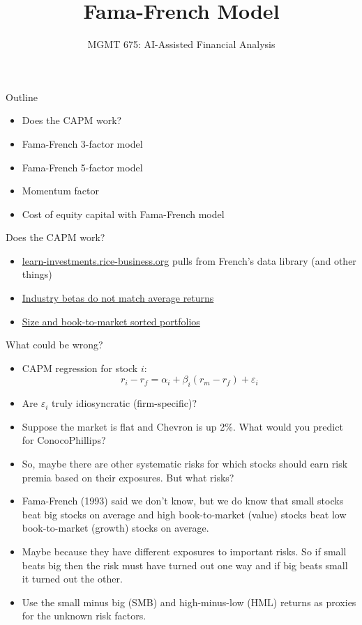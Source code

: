 \documentclass[10pt]{beamer}
\title{Fama-French Model}
\subtitle{MGMT 675: AI-Assisted Financial Analysis}
\date{}
\begin{document}
\begin{frame}[plain]
\titlepage
\end{frame}

\begin{frame}{Outline}
\begin{itemize}
\item Does the CAPM work?
\item Fama-French 3-factor model
\item Fama-French 5-factor model
\item Momentum factor
\item Cost of equity capital with Fama-French model
\end{itemize}
\end{frame}

\begin{frame}{Does the CAPM work?}
\begin{itemize}
    \item \href{https://learn-investments.rice-business.org}{learn-investments.rice-business.org} pulls from French's data library (and other things)
    \item \href{https://learn-investments.rice-business.org/capm/sml-industries}{Industry betas do not match average returns}
    \item \href{https://learn-investments.rice-business.org/capm/two-way-capm}{Size and book-to-market sorted portfolios}
\end{itemize}
\end{frame}


\begin{frame}{What could be wrong?}
\begin{itemize}
\item CAPM regression for stock $i$:
$$r_i - r_f = \alpha_i + \beta_i (r_m - r_f) + \varepsilon_i$$
\item Are $\varepsilon_i$ truly idiosyncratic (firm-specific)? 
\item \pause Suppose the market is flat and Chevron is up 2\%.  What would you predict for ConocoPhillips?  \item \pause So, maybe there are other systematic risks for which stocks should earn risk premia based on their exposures.  But what risks?
\item \pause Fama-French (1993) said we don't know, but we do know that small stocks beat big stocks on average and high book-to-market (value) stocks beat low book-to-market (growth) stocks on average.
\item Maybe because they have different exposures to important risks.  So if small beats big then the risk must have turned out one way and if big beats small it turned out the other.
\item \pause Use the small minus big (SMB) and high-minus-low (HML) returns as proxies for the unknown risk factors.

\end{itemize}
\end{frame}
\end{document}
